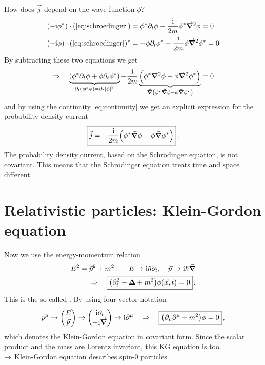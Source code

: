 How does $\vec j$ depend on the wave function $\phi$?
\begin{align*}
    \qty(-\ti \phi^*) \cdot (\cref{eq:schroedinger}) & = \phi^*\pa_t \phi - \frac{\ti}{2m} \phi^* \vec \grad ^2 \phi = 0 \\
    \qty(- \ti \phi) \cdot (\cref{eq:schroedinger})^* & = - \phi \pa_t \phi^* - \frac{\ti}{2m} \phi \vec \grad ^2 \phi^* = 0
\end{align*}
By subtracting these two equations we get
\begin{align}
    \Rightarrow \quad \underbrace{\qty(\phi^*\partial_t \phi + \phi \partial_t \phi^*)}_{\partial_t \qty(\phi^*\phi) = \partial_t \qty|\phi|^2} - \frac{\mathrm{i}}{2m} \underbrace{\qty(\phi^* \vec \grad ^2 \phi - \phi \vec \grad^2 \phi^*)}_{\vec \grad \qty(\phi^*\vec \grad \phi - \phi \vec \grad \phi^*)} = 0
\end{align}
and by using the continuity \cref{eq:continuity} we get an explicit expression for the probability density current
\begin{align}
    \boxed{ \vec j = - \frac{\mathrm{i}}{2m}\qty(\phi^*\vec \grad \phi - \phi \vec \grad \phi^*) }\,.
\end{align}
The probability density current, based on the Schrödinger equation, is not covariant. This means that the Schrödinger equation treats time and space different.

\section{Relativistic particles: Klein-Gordon equation}
Now we use the  energy-momentum relation
\begin{align}
    E^2 = \vec p^2 +m^2 \qquad E \rightarrow \mathrm{i} \hbar \partial_t, \quad \vec p \rightarrow \mathrm{i} \hbar \vec \grad\nonumber \\
    \Rightarrow \quad \boxed{\qty(\partial_t^2 - \bm{\Delta} +m^2) \phi \qty(\vec x, t) = 0}\,. \label{eq:KGe}
\end{align}
This is the so-called . By using four vector notation
\begin{align}
    p^\mu \ra \mqty(E \\ \vec p) \ra \mqty(\ti \pa_t \\ - \ti \vec \grad) \ra \ti \pa^\mu \quad \Ra \quad \boxed{\qty(\pa_\mu\pa^\mu + m^2) \phi = 0}\,,
\end{align}
which denotes the Klein-Gordon equation in covariant form. Since the scalar product and the mass are Lorentz invariant, this KG equation is too.\\
$\rightarrow$ Klein-Gordon equation describes spin-0 particles.

